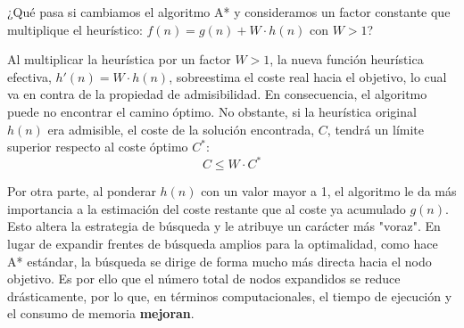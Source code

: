 \documentclass[11pt, a4paper]{article}
\newenvironment{problem}[1][Cuestión]{
	\vspace{0.5cm}
	\noindent{\Large\bfseries #1} \par\vspace{0.5cm}
}{
	\vspace{0.5cm}
}
\begin{document}
	\begin{problem}[Cuestión 3 (10\%)]
		¿Qué pasa si cambiamos el algoritmo A* y consideramos un factor constante que multiplique el heurístico: $f(n) = g(n) + W \cdot h(n)$ con $W > 1$?

		{ \color{blue} 
			Al multiplicar la heurística por un factor $W > 1$, la nueva función heurística efectiva, $h'(n) = W \cdot h(n)$, sobreestima el coste real hacia el objetivo, lo cual va en contra de la propiedad de admisibilidad. En consecuencia, el algoritmo puede no encontrar el camino óptimo. No obstante, si la heurística original $h(n)$ era admisible, el coste de la solución encontrada, $C$, tendrá un límite superior respecto al coste óptimo $C^*$:$$C \le W \cdot C^*$$ 

			Por otra parte, al ponderar $h(n)$ con un valor mayor a 1, el algoritmo le da más importancia a la estimación del coste restante que al coste ya acumulado $g(n)$. Esto altera la estrategia de búsqueda y le atribuye un carácter más "voraz". En lugar de expandir frentes de búsqueda amplios para la optimalidad, como hace A* estándar, la búsqueda se dirige de forma mucho más directa hacia el nodo objetivo. Es por ello que el número total de nodos expandidos se reduce drásticamente, por lo que, en términos computacionales, el tiempo de ejecución y el consumo de memoria \textbf{mejoran}.
		}

		\vspace{0.5cm}
	\end{problem}
\end{document}
